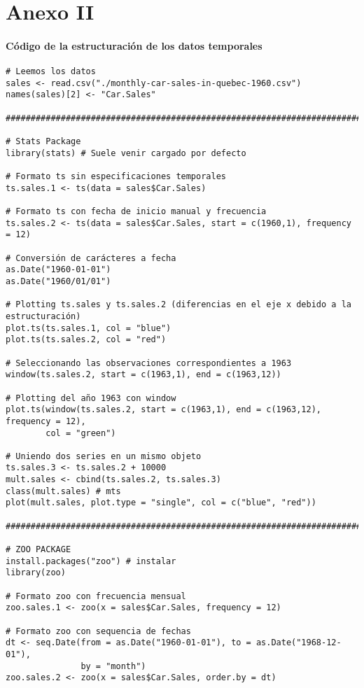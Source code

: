 \documentclass[12pt,a4paper,oneside]{article}
\begin{document}
\part*{Anexo II}

\subsection*{Código de la estructuración de los datos temporales}

\begin{Verbatim}[fontsize=\footnotesize]
# Leemos los datos
sales <- read.csv("./monthly-car-sales-in-quebec-1960.csv")
names(sales)[2] <- "Car.Sales"

#######################################################################################

# Stats Package
library(stats) # Suele venir cargado por defecto

# Formato ts sin especificaciones temporales
ts.sales.1 <- ts(data = sales$Car.Sales)

# Formato ts con fecha de inicio manual y frecuencia
ts.sales.2 <- ts(data = sales$Car.Sales, start = c(1960,1), frequency = 12)

# Conversión de carácteres a fecha
as.Date("1960-01-01")
as.Date("1960/01/01")

# Plotting ts.sales y ts.sales.2 (diferencias en el eje x debido a la estructuración)
plot.ts(ts.sales.1, col = "blue")
plot.ts(ts.sales.2, col = "red")

# Seleccionando las observaciones correspondientes a 1963
window(ts.sales.2, start = c(1963,1), end = c(1963,12))

# Plotting del año 1963 con window
plot.ts(window(ts.sales.2, start = c(1963,1), end = c(1963,12), frequency = 12),
        col = "green")

# Uniendo dos series en un mismo objeto
ts.sales.3 <- ts.sales.2 + 10000
mult.sales <- cbind(ts.sales.2, ts.sales.3)
class(mult.sales) # mts
plot(mult.sales, plot.type = "single", col = c("blue", "red"))

#######################################################################################

# ZOO PACKAGE
install.packages("zoo") # instalar
library(zoo)

# Formato zoo con frecuencia mensual
zoo.sales.1 <- zoo(x = sales$Car.Sales, frequency = 12)

# Formato zoo con sequencia de fechas
dt <- seq.Date(from = as.Date("1960-01-01"), to = as.Date("1968-12-01"),
               by = "month")
zoo.sales.2 <- zoo(x = sales$Car.Sales, order.by = dt)


\end{Verbatim}
\end{document}
